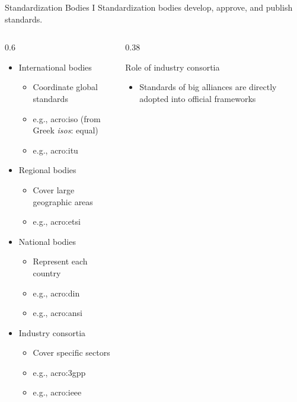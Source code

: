 \begin{frame}{Standardization Bodies I}
  Standardization bodies develop, approve, and publish standards.
  \begin{columns}[onlytextwidth]
    \begin{column}{0.6\textwidth}
      \begin{itemize}
        \item International bodies
          \begin{itemize}
            \item Coordinate global standards
            \item e.g., \gls{acro:iso} (from Greek \textit{isos}: equal)
            \item e.g., \gls{acro:itu}
          \end{itemize}
        \item Regional bodies
          \begin{itemize}
            \item Cover large geographic areas
            \item e.g., \gls{acro:etsi}
          \end{itemize}
        \item National bodies
          \begin{itemize}
            \item Represent each country
            \item e.g., \gls{acro:din}
            \item e.g., \gls{acro:ansi}
          \end{itemize}
        \item Industry consortia
          \begin{itemize}
            \item Cover specific sectors
            \item e.g., \gls{acro:3gpp}
            \item e.g., \gls{acro:ieee}
          \end{itemize}
      \end{itemize}
    \end{column}
    \begin{column}{0.38\textwidth}
      \begin{block}{Role of industry consortia}
        \begin{itemize}
          \item Standards of big alliances are directly adopted into official frameworks\\

\end{itemize}
\end{block}
\end{column}
\end{columns}
\end{frame}
